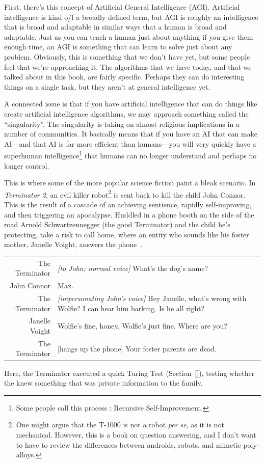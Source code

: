 First, there's this concept of Artificial General Intelligence
(AGI). Artificial intelligence is kind o/f a broadly defined term, but
AGI is roughly an intelligence that is broad and adaptable in similar
ways that a human is broad and adaptable. Just as you can teach a
human just about anything if you give them enough time, an AGI is
something that can learn to solve just about any problem. Obviously,
this is something that we don't have yet, but some people feel that
we're approaching it. The algorithms that we have today, and that we
talked about in this book, are fairly specific. Perhaps they can do
interesting things on a single task, but they aren't at 
general intelligence yet.

A connected issue is that if you have artificial intelligence that can
do things like create artificial intelligence algorithms, we may
approach something called the ``singularity''. The singularity is
taking on almost religious implications in a number of communities. It
basically means that if you have an AI that can make AI—and that AI is
far more efficient than humans—you will very quickly have a superhuman
intelligence\footnote{Some people call this process :
  Recursive Self-Improvement.} that humans can no longer understand
and perhaps no longer control.

This is where some of the more popular science fiction paint a bleak
scenario.
%
In \textit{Terminator 2}, an evil killer robot\footnote{One might
  argue that the T-1000 is not a robot \textit{per se}, as it is not
  mechanical.  However, this is a book on question answering, and I
  don't want to have to review the differences between androids,
  robots, and mimetic poly-alloys.} is sent back to kill the child
John Connor.
%
This is the result of a cascade of an  achieving sentience,
rapidly self-improving, and then triggering an apocalypse.
%
Huddled in a phone booth on the side of the road Arnold
Schwartzennegger (the good Terminator) and the child he's protecting,
take a risk to call home, where an entity who sounds like his foster
mother, Janelle Voight, answers the phone~\cite{}.
\begin{tabular}{rp{16cm}}
The Terminator & \textit{[to John; normal voice]} What's the dog's name? \\
John Connor & Max. \\
The Terminator & \textit{[impersonating John's voice]} Hey Janelle, what's wrong with Wolfie? I can hear him barking. Is he all right? \\
Janelle Voight & Wolfie's fine, honey. Wolfie's just fine. Where are you? \\
The Terminator& [hangs up the phone] Your foster parents are dead. 
\end{tabular}
Here, the Terminator executed a quick Turing Test (Section~\ref{}),
testing whether the  knew something that was private
information to the family.


